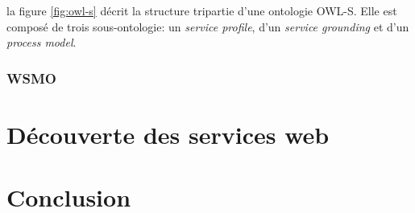      la figure \ref{fig:owl-s} décrit la structure tripartie d'une
      ontologie \textsc{OWL-S}. Elle est composé de trois sous-ontologie: un
      \emph{service profile}, d'un \emph{service grounding} et d'un
      \emph{process model}.
      \subsubsection{WSMO}
      \cite{baryannis2010}
  \section{Découverte des services web}

  \section{Conclusion}

